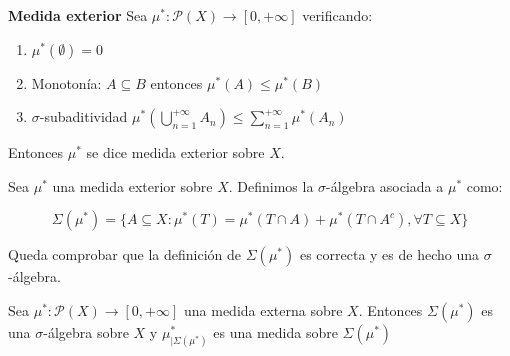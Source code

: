 \begin{definition} \textbf{Medida exterior}
 Sea $\mu^\ast : \mathcal{P}(X) \rightarrow [0, +\infty]$ verificando:
 
 \begin{enumerate}[i]
  \item $\mu^\ast(\emptyset) = 0$
  \item Monotonía: $A\subseteq B$ entonces $\mu^\ast(A) \le \mu^\ast(B)$
  \item $\sigma$-subaditividad $\mu^\ast \left(\bigcup_{n=1}^{+\infty} A_n \right) \le \sum_{n=1}^{+\infty} \mu^\ast (A_n)$
 \end{enumerate}
 
 Entonces $\mu^\ast$ se dice medida exterior sobre $X$.
\end{definition}

\begin{definition}
 Sea $\mu^\ast$ una medida exterior sobre $X$. Definimos la $\sigma$-álgebra asociada a $\mu^\ast$ como:
 
 \[\Sigma(\mu^\ast) = \{A\subseteq X: \mu^\ast(T) = \mu^\ast(T\cap A) + \mu^\ast(T\cap A^c), \forall T\subseteq X\}\]
\end{definition}

Queda comprobar que la definición de $\Sigma(\mu^\ast)$ es correcta y es de hecho una $\sigma$-álgebra.

\begin{theorem}
 Sea $\mu^\ast : \mathcal{P}(X) \rightarrow [0, +\infty]$ una medida externa sobre $X$. Entonces $\Sigma(\mu^\ast)$
 es una $\sigma$-álgebra sobre $X$ y $\mu^\ast_{|\Sigma(\mu^\ast)}$ es una medida sobre $\Sigma(\mu^\ast)$
 
 \label{th:outer-to-measure}
\end{theorem}


